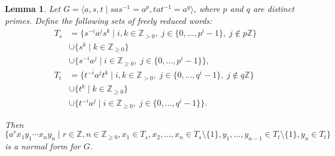 \documentclass[11pt]{amsart}
\newtheorem{lem}[theorem]{Lemma}
\theoremstyle{definition}
\numberwithin{theorem}{section}
\newcommand{\Z}{\mathbb{Z}}
\begin{document}
	\begin{lem}
		\label{GBS-norm-form}
		Let \(G = \langle a, s, t \mid sas^{-1} = a^p, tat^{-1} = a^q
		\rangle\), where \(p\) and \(q\) are distinct primes. 
Define
				the following sets of freely reduced words:
				\begin{align*} 
T_s & =    
\{ s^{-i} a^j s^k \mid i,k \in \Z_{> 0}, \; j \in \{0, \ldots, p^i - 1\}, \; j \not\in p\Z \}  \\
& \cup \{ s^k \mid k \in \Z_{\geq 0} \} \\ 
& \cup \{ s^{-i} a^j \mid i \in \Z_{\geq 0}, \; j \in \{0, \ldots, p^i - 1\} \}, \\ 
T_t & =    
\{ t^{-i} a^j t^k \mid i,k \in \Z_{> 0}, \; j \in \{0, \ldots, q^i - 1\}, \; j \not\in q\Z \}  \\
& \cup \{ t^k \mid k \in \Z_{\geq 0} \} \\ 
& \cup \{ t^{-i} a^j \mid i \in \Z_{\geq 0}, \; j \in \{0, \ldots, q^i - 1\} \}.   
\end{align*} 

		Then 
		\[
			\{a^r x_1 y_1 \cdots x_n y_n \mid r \in \Z, n \in \Z_{\geq 0},
					x_1 \in T_s, x_2, \ldots, x_n \in T_s \setminus \{1\}, 
			y_1, \ldots, y_{n - 1} \in T_t \setminus \{1\}, y_n \in T_t \}
		\]
		is a normal form for \(G\).
	\end{lem}
\end{document}

